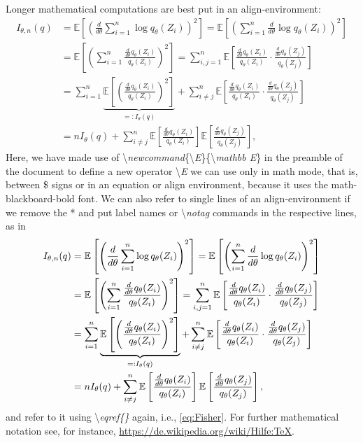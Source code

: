 \documentclass[aodsor,preprint]{imsart}
\numberwithin{equation}{section}
\theoremstyle{plain}
\newcommand{\E}{{\mathbb E}}
\begin{document}
Longer mathematical computations are best put in an align-environment:
\begin{align*}
I_{\theta,n}(q) &= \E\left[ \left(\frac{d}{d\theta} \sum_{i=1}^n \log q_\theta(Z_i)\right)^2\right]
=
\E\left[ \left( \sum_{i=1}^n \frac{d}{d\theta}\log q_\theta(Z_i)\right)^2\right] \\
&=
\E\left[ \left( \sum_{i=1}^n \frac{\frac{d}{d\theta}q_\theta(Z_i)}{q_\theta(Z_i)}\right)^2\right]
=
\sum_{i,j=1}^n \E\left[ \frac{\frac{d}{d\theta}q_\theta(Z_i)}{q_\theta(Z_i)} \cdot \frac{\frac{d}{d\theta}q_\theta(Z_j)}{q_\theta(Z_j)}\right]\\
&=
\sum_{i=1}^n \underbrace{\E\left[ \left(\frac{\frac{d}{d\theta}q_\theta(Z_i)}{q_\theta(Z_i)}\right)^2\right]}_{=:I_\theta(q)} + \sum_{i\neq j}^n \E\left[ \frac{\frac{d}{d\theta}q_\theta(Z_i)}{q_\theta(Z_i)} \cdot \frac{\frac{d}{d\theta}q_\theta(Z_j)}{q_\theta(Z_j)}\right]\\
&= n I_\theta(q) + \sum_{i\neq j}^n \E\left[ \frac{\frac{d}{d\theta}q_\theta(Z_i)}{q_\theta(Z_i)}\right] \E\left[ \frac{\frac{d}{d\theta}q_\theta(Z_j)}{q_\theta(Z_j)}\right],
\end{align*}
Here, we have made use of \textbackslash\emph{newcommand}\{\textbackslash\emph{E}\}\{\textbackslash\emph{mathbb E}\} in the preamble of the document to define a new operator \textbackslash\emph{E} we can use only in math mode, that is, between \$ signs or in an equation or align environment, because it uses the math-blackboard-bold font. We can also refer to single lines of an align-environment if we remove the * and put label names or \textbackslash\emph{notag} commands in the respective lines, as in
\begin{align}
I_{\theta,n}(q) &= \E\left[ \left(\frac{d}{d\theta} \sum_{i=1}^n \log q_\theta(Z_i)\right)^2\right]
=
\E\left[ \left( \sum_{i=1}^n \frac{d}{d\theta}\log q_\theta(Z_i)\right)^2\right] \notag\\
&=
\E\left[ \left( \sum_{i=1}^n \frac{\frac{d}{d\theta}q_\theta(Z_i)}{q_\theta(Z_i)}\right)^2\right]
=
\sum_{i,j=1}^n \E\left[ \frac{\frac{d}{d\theta}q_\theta(Z_i)}{q_\theta(Z_i)} \cdot \frac{\frac{d}{d\theta}q_\theta(Z_j)}{q_\theta(Z_j)}\right]\label{eq:Fisher}\\
&=
\sum_{i=1}^n \underbrace{\E\left[ \left(\frac{\frac{d}{d\theta}q_\theta(Z_i)}{q_\theta(Z_i)}\right)^2\right]}_{=:I_\theta(q)} + \sum_{i\neq j}^n \E\left[ \frac{\frac{d}{d\theta}q_\theta(Z_i)}{q_\theta(Z_i)} \cdot \frac{\frac{d}{d\theta}q_\theta(Z_j)}{q_\theta(Z_j)}\right]\notag\\
&= n I_\theta(q) + \sum_{i\neq j}^n \E\left[ \frac{\frac{d}{d\theta}q_\theta(Z_i)}{q_\theta(Z_i)}\right] \E\left[ \frac{\frac{d}{d\theta}q_\theta(Z_j)}{q_\theta(Z_j)}\right],\notag
\end{align}
and refer to it using \textbackslash\emph{eqref\{\}} again, i.e., \eqref{eq:Fisher}.
For further mathematical notation see, for instance, \url{https://de.wikipedia.org/wiki/Hilfe:TeX}.
\end{document}
